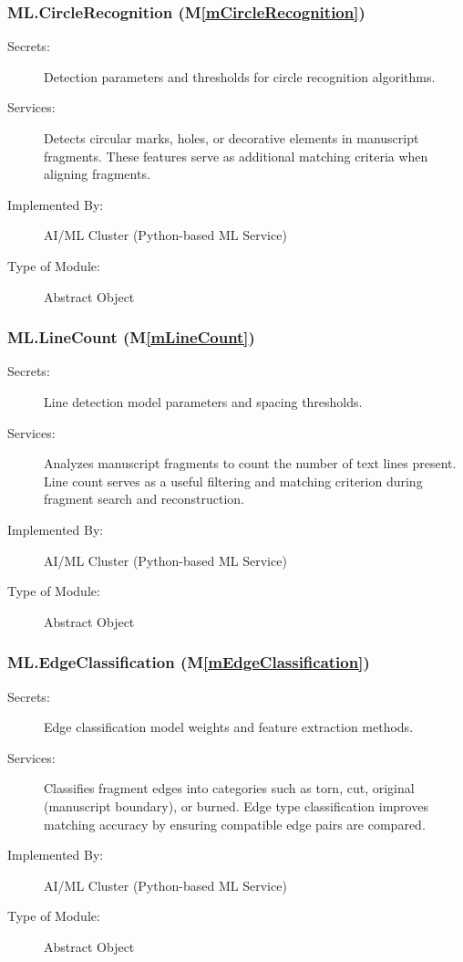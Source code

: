\documentclass[12pt, titlepage]{article}
\newcommand{\mref}[1]{M\ref{#1}}
\begin{document}
\subsubsection{ML.CircleRecognition (\mref{mCircleRecognition})}

\begin{description}
\item[Secrets:] Detection parameters and thresholds for circle recognition algorithms.
\item[Services:] Detects circular marks, holes, or decorative elements in manuscript fragments. These features serve as additional matching criteria when aligning fragments.
\item[Implemented By:] AI/ML Cluster (Python-based ML Service)
\item[Type of Module:] Abstract Object
\end{description}


\subsubsection{ML.LineCount (\mref{mLineCount})}

\begin{description}
\item[Secrets:] Line detection model parameters and spacing thresholds.
\item[Services:] Analyzes manuscript fragments to count the number of text lines present. Line count serves as a useful filtering and matching criterion during fragment search and reconstruction.
\item[Implemented By:] AI/ML Cluster (Python-based ML Service)
\item[Type of Module:] Abstract Object
\end{description}


\subsubsection{ML.EdgeClassification (\mref{mEdgeClassification})}

\begin{description}
\item[Secrets:] Edge classification model weights and feature extraction methods.
\item[Services:] Classifies fragment edges into categories such as torn, cut, original (manuscript boundary), or burned. Edge type classification improves matching accuracy by ensuring compatible edge pairs are compared.
\item[Implemented By:] AI/ML Cluster (Python-based ML Service)
\item[Type of Module:] Abstract Object
\end{description}
\end{document}
